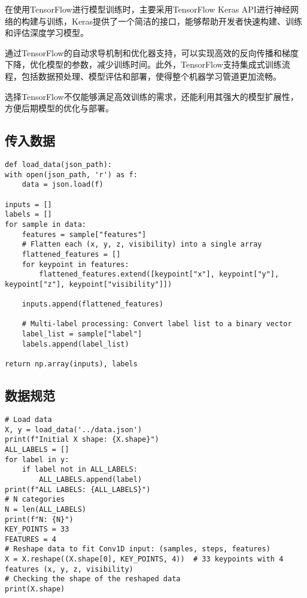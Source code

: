 在使用TensorFlow进行模型训练时，主要采用TensorFlow Keras API进行神经网络的构建与训练，Keras提供了一个简洁的接口，能够帮助开发者快速构建、训练和评估深度学习模型。

通过TensorFlow的自动求导机制和优化器支持，可以实现高效的反向传播和梯度下降，优化模型的参数，减少训练时间。此外，TensorFlow支持集成式训练流程，包括数据预处理、模型评估和部署，使得整个机器学习管道更加流畅。

选择TensorFlow不仅能够满足高效训练的需求，还能利用其强大的模型扩展性，方便后期模型的优化与部署。


\subsection{传入数据}

\begin{lstlisting}
def load_data(json_path):
with open(json_path, 'r') as f:
    data = json.load(f)

inputs = []
labels = []
for sample in data:
    features = sample["features"]
    # Flatten each (x, y, z, visibility) into a single array
    flattened_features = []
    for keypoint in features:
        flattened_features.extend([keypoint["x"], keypoint["y"], keypoint["z"], keypoint["visibility"]])

    inputs.append(flattened_features)

    # Multi-label processing: Convert label list to a binary vector
    label_list = sample["label"]
    labels.append(label_list)

return np.array(inputs), labels
\end{lstlisting}

\subsection{数据规范}

\begin{lstlisting}
# Load data
X, y = load_data('../data.json')
print(f"Initial X shape: {X.shape}")
ALL_LABELS = []
for label in y:
    if label not in ALL_LABELS:
        ALL_LABELS.append(label)
print(f"ALL LABELS: {ALL_LABELS}")
# N categories
N = len(ALL_LABELS)
print(f"N: {N}")
KEY_POINTS = 33
FEATURES = 4
# Reshape data to fit Conv1D input: (samples, steps, features)
X = X.reshape((X.shape[0], KEY_POINTS, 4))  # 33 keypoints with 4 features (x, y, z, visibility)
# Checking the shape of the reshaped data
print(X.shape)
\end{lstlisting}

